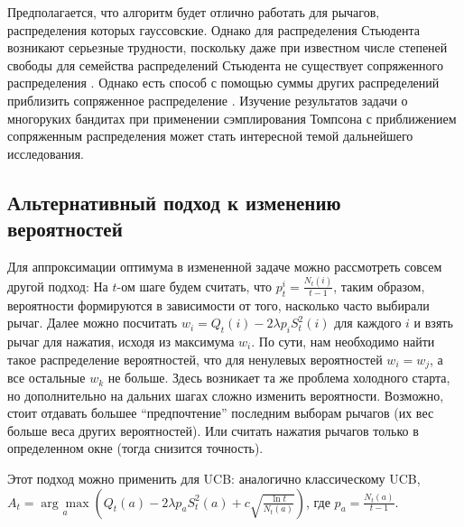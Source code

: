 Предполагается, что алгоритм будет отлично работать для рычагов, распределения которых гауссовские. Однако для распределения Стьюдента возникают серьезные трудности, поскольку даже при известном числе степеней свободы для семейства распределений Стьюдента не существует сопряженного распределения \cite{conjugate_priors}. Однако есть способ с помощью суммы других распределений приблизить сопряженное распределение \cite{approx_of_conjugate_prior}. Изучение результатов задачи о многоруких бандитах при применении сэмплирования Томпсона с приближением сопряженным распределения может стать интересной темой дальнейшего исследования.

\subsection{Альтернативный подход к изменению вероятностей}

Для аппроксимации оптимума в измененной задаче можно рассмотреть совсем другой подход: На $t$-ом шаге будем считать, что $p_t^i = \frac{N_t(i)}{t-1}$, таким образом, вероятности формируются в зависимости от того, насколько часто выбирали рычаг. Далее можно посчитать $w_i = Q_t(i) - 2 \lambda p_i S_t^2(i)$ для каждого $i$ и взять рычаг для нажатия, исходя из максимума $w_i$. По сути, нам необходимо найти такое распределение вероятностей, что для ненулевых вероятностей $w_i = w_j$, а все остальные $w_k$ не больше. Здесь возникает та же проблема холодного старта, но дополнительно на дальних шагах сложно изменить вероятности. Возможно, стоит отдавать большее ``предпочтение'' последним выборам рычагов (их вес больше веса других вероятностей). Или считать нажатия рычагов только в определенном окне (тогда снизится точность).

Этот подход можно применить для UCB: аналогично классическому UCB, \\
$A_t = \underset{a}{\arg \max} \left( Q_t(a) - 2 \lambda p_a S_t^2(a) + c \sqrt{\frac{\ln t}{N_t(a)}} \right)$, где $p_a = \frac{N_t(a)}{t-1}$.